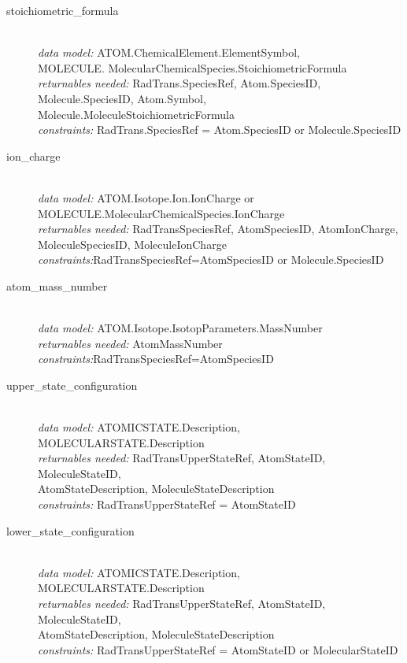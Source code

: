 \documentclass[11pt,a4paper]{ivoa}
\begin{document}
\begin{description}
\item [stoichiometric\_formula] \hfill\\
	\textit{data model:} ATOM.ChemicalElement.ElementSymbol,\\ MOLECULE. MolecularChemicalSpecies.StoichiometricFormula\\
	\textit{returnables needed:} RadTrans.SpeciesRef, Atom.SpeciesID, Molecule.SpeciesID, Atom.Symbol, Molecule.MoleculeStoichiometricFormula\\
	\textit{constraints:}  RadTrans.SpeciesRef = Atom.SpeciesID or  Molecule.SpeciesID

\item [ion\_charge]\hfill\\
	\textit{data model:} ATOM.Isotope.Ion.IonCharge or MOLECULE.MolecularChemicalSpecies.IonCharge \\
	\textit{returnables needed:} RadTransSpeciesRef, AtomSpeciesID, AtomIonCharge, MoleculeSpeciesID, MoleculeIonCharge \\
	\textit{constraints:}RadTransSpeciesRef=AtomSpeciesID or  Molecule.SpeciesID

	\item [atom\_mass\_number]\hfill\\
	\textit{data model:} ATOM.Isotope.IsotopParameters.MassNumber \\
	\textit{returnables needed:} AtomMassNumber\\
	\textit{constraints:}RadTransSpeciesRef=AtomSpeciesID

	\item [upper\_state\_configuration]\hfill\\
	\textit{data model:} ATOMICSTATE.Description, MOLECULARSTATE.Description\\
	\textit{returnables needed:} RadTransUpperStateRef, AtomStateID, MoleculeStateID,\\ AtomStateDescription, MoleculeStateDescription\\
	\textit{constraints:}  RadTransUpperStateRef = AtomStateID

	\item [lower\_state\_configuration]\hfill\\
	\textit{data model:} ATOMICSTATE.Description, MOLECULARSTATE.Description\\
	\textit{returnables needed:} RadTransUpperStateRef, AtomStateID, MoleculeStateID,\\ AtomStateDescription, MoleculeStateDescription\\
	\textit{constraints:}  RadTransUpperStateRef = AtomStateID or MolecularStateID
	

\end{description}
\end{document}
